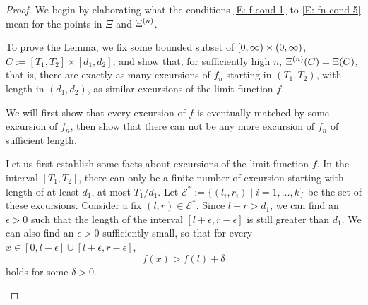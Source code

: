 \begin{proof}
We begin by elaborating what the conditions
\eqref{E: f cond 1} to \eqref{E: fn cond 5}
mean for the points in
$\Xi$ and $\Xi^{(n)}$.

To prove the Lemma, 
we fix some bounded subset of
$[0, \infty) \times (0, \infty)$,
$C := [T_1, T_2] \times [d_1, d_2]$,
and show that, for sufficiently high $n$,
$\Xi^{(n)}(C) = \Xi(C)$,
that is,
there are exactly as many excursions of $f_n$ starting in
$(T_1, T_2)$, 
with length in $(d_1, d_2)$,
as similar excursions of the limit function $f$.

We will first show that every excursion of $f$ is eventually matched by some excursion of $f_n$,
then show that there can not be any more excursion of $f_n$ of sufficient length.


\begin{proofpart}

Let us first establish some facts about excursions of the limit function $f$.
In the interval $[T_1, T_2]$,
there can only be a finite number of excursion starting with length of at least $d_1$,
at most $T_1/d_1$.
Let
$ \mathcal{E}^* := \{ (l_i, r_i) \; | \; i=1, \dots, k \} $
be the set of these excursions.
Consider a fix
$(l,r) \in \mathcal{E}^*$.
Since $l-r > d_1$,
we can find an $\epsilon > 0$
such that the length of the interval
$[l+\epsilon, r-\epsilon]$
is still greater than $d_1$.
We can also find an $\epsilon > 0$ sufficiently small,
so that for every
$x \in [0, l-\epsilon] \cup [l+\epsilon, r-\epsilon]$,
\begin{equation}
f(x) > f(l) + \delta
\end{equation}
holds for some $\delta > 0$.
	
	
\end{proofpart}


\begin{proofpart}
	\lipsum[100]
\end{proofpart}

	
\end{proof}


